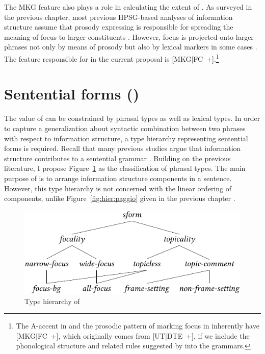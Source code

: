 The MKG feature also plays a role in calculating the extent of
. As surveyed in the previous
chapter, most previous HPSG-based analyses of information structure
assume that prosody expressing  is responsible for
spreading the meaning of focus to larger constituents
\citep{bildhauer:07}.  However, focus is projected onto larger phrases
not only by means of prosody but also by lexical markers in some cases
\citep{choe:02}. The feature responsible for
 in the current proposal is \mbox{[MKG{$\mid$}FC
    +]}.\footnote{The A-accent in  and the prosodic
  pattern of marking focus in  inherently have
  \mbox{[MKG{$\mid$}FC +]}, which originally comes from
  \mbox{[UT{$\mid$}DTE +]}, if we include the phonological structure
  and related rules suggested by \citet{bildhauer:07} into the
  grammars.}




\section{Sentential forms \textnormal{(}\textnormal{)}}
\label{9:ssec:sform}


The value of  can be constrained by phrasal types as well
as lexical types. In order to
capture a generalization about syntactic combination between two
phrases with respect to information structure, a type hierarchy
representing sentential forms is required. Recall that many previous
studies argue that information structure contributes to a sentential
grammar
\citep{lambrecht:96,engdahl:vallduvi:96,paggio:09,song:bender:11}.
Building on the previous literature, I propose Figure~\ref{fig:sform}
as the classification of phrasal types. The main purpose of
 is to arrange information structure components in a
sentence. However, this type hierarchy is not
concerned with the linear ordering of components, unlike
Figure~\ref{fig:hier:paggio} given in the previous
chapter .



\begin{figure}[!t]
\begin{center} 
\includegraphics{pdf/sform.pdf}
\caption{Type hierarchy of }
\label{fig:sform}
\end{center}
\end{figure}


